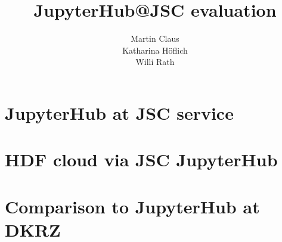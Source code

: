 \documentclass[11pt,a4paper]{article}
\title{\textbf{JupyterHub@JSC evaluation}}
\author{
  Martin Claus \\ %
	Katharina Höflich \\
	Willi Rath}
\begin{document}
\maketitle
\tableofcontents


%





\section{JupyterHub at JSC service}















\section{HDF cloud via JSC JupyterHub}
\label{s-hdfcloud-jsc-jhub}


\section{Comparison to JupyterHub at DKRZ}
\label{s-comparison-dkrz}












\end{document}
